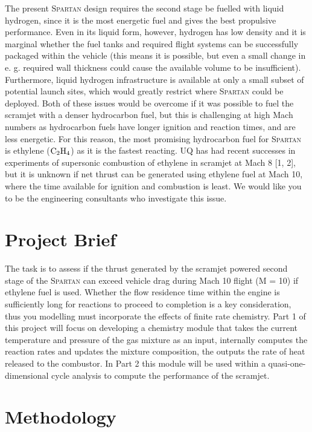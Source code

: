 \documentclass[a4paper]{article}
\begin{document}
The present \textsc{Spartan} design requires the second stage be fuelled with liquid hydrogen, since it is the most energetic fuel and gives the best propulsive performance. Even in its liquid form, however, hydrogen has low density and it is marginal whether the fuel tanks and required flight systems can be successfully packaged within the vehicle (this means it is possible, but even a small change in e. g. required wall thickness could cause the available volume to be insufficient). Furthermore, liquid hydrogen infrastructure is available at only a small subset of potential launch sites, which would greatly restrict where \textsc{Spartan} could be deployed. Both of these issues would be overcome if it was possible to fuel the scramjet with a denser hydrocarbon fuel, but this is challenging at high Mach numbers as hydrocarbon fuels have longer ignition and reaction times, and are less energetic. For this reason, the most promising hydrocarbon fuel for \textsc{Spartan} is ethylene (\(\ce{C2H4}\)) as it is the fastest reacting. UQ has had recent successes in experiments of supersonic combustion of ethylene in scramjet at Mach 8 [1, 2], but it is unknown if net thrust can be generated using ethylene fuel at Mach 10, where the time available for ignition and combustion is least. We would like you to be the engineering consultants who investigate this issue.

\section{Project Brief}
The task is to assess if the thrust generated by the scramjet powered second stage of the \textsc{Spartan} can exceed vehicle drag during Mach 10 flight (M = 10) if ethylene fuel is used. Whether the flow residence time within the engine is sufficiently long for reactions to proceed to completion is a key consideration, thus you modelling must incorporate the effects of finite rate chemistry. Part 1 of this project will focus on developing a chemistry module that takes the current temperature and pressure of the gas mixture as an input, internally computes the reaction rates and updates the mixture composition, the outputs the rate of heat released to the combustor. In Part 2 this module will be used within a quasi-one-dimensional cycle analysis to compute the performance of the scramjet.

\section{Methodology}\label{sec:methodology}
\end{document}
